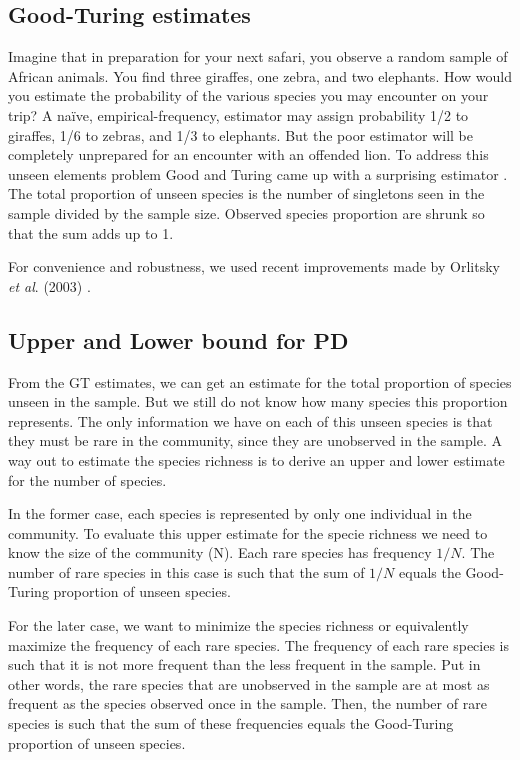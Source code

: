 \documentclass{article}
\begin{document}
\subsection*{Good-Turing estimates}

\label{GT}

Imagine that in preparation for your next safari, you observe a random sample of African animals. 
You find three giraffes, one zebra, and two elephants. 
How would you estimate the probability of the various species you may encounter on your trip? 
A naïve, empirical-frequency, estimator may assign probability 1/2 to giraffes, 1/6 to zebras, and 1/3 to elephants. 
But the poor estimator will be completely unprepared for an encounter with an offended lion. 
To address this unseen elements problem Good and Turing came up with a surprising estimator \cite{Good1953}. The total proportion of unseen species is the number of singletons seen in the sample divided by the sample size. Observed species proportion are shrunk so that the sum adds up to 1.

For convenience and robustness, we used recent improvements made by Orlitsky \textit{et al}. (2003) \cite{Orlitsky2003}. 


\subsection*{Upper and Lower bound for PD}
\label{up_low}

From the GT estimates, we can get an estimate for the total proportion of species unseen in the sample. 
But we still do not know how many species this proportion represents. 
The only information we have on each of this unseen species is that they must be rare in the community, since they are unobserved in the sample.
A way out to estimate the species richness is to derive an upper and lower estimate for the number of species. 

In the former case, each species is represented by only one individual in the community. To evaluate this upper estimate for the specie richness we need to know the size of the community (N). Each rare species has  frequency $1/N$. The number of rare species in this case is such that the sum of $1/N$ equals the Good-Turing proportion of unseen species. 

For the later case, we want to minimize the species richness or equivalently maximize the frequency of each rare species. 
The frequency of each rare species is such that it is not more frequent than the less frequent in the sample. 
Put in other words, the rare species that are unobserved in the sample are at most as frequent as the species observed once in the sample. 
Then, the number of rare species is such that the sum of these frequencies equals the Good-Turing proportion of unseen species.
	
\end{document}

